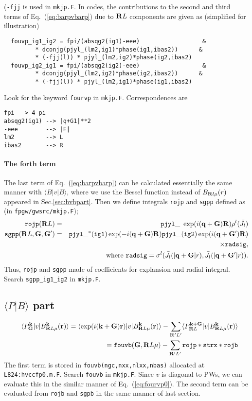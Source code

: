 \documentclass[a4paper,10pt,fleqn]{article}
\newcommand{\bfq}{{\bf q}}
\newcommand{\bfk}{{\bf k}}
\newcommand{\bfr}{{\bf r}}
\newcommand{\bfG}{{\bf G}}
\newcommand{\bfR}{{\bf R}}
\newcommand{\req}[1]{\mbox{Eq.~(\ref{#1})}}
\begin{document}
({\tt -fjj} is used in {\tt mkjp.F}.
In codes, the contributions to the second and third terms of \req{eq:barpvbarp} due to $\bfR{L}$ components are given as (simplified for illustration) 
\begin{verbatim}
  fouvp_ig1_ig2 = fpi/(absqg2(ig1)-eee)                  &
         * dconjg(pjyl_(lm2,ig1)*phase(ig1,ibas2))      &  
         * (-fjj(l)) * pjyl_(lm2,ig2)*phase(ig2,ibas2)
  fouvp_ig2_ig1 = fpi/(absqg2(ig2)-eee)                  & 
         * dconjg(pjyl_(lm2,ig2)*phase(ig2,ibas2))      &
         * (-fjj(l)) * pjyl_(lm2,ig1)*phase(ig1,ibas2)
\end{verbatim}
Look for the keyword \verb!fourvp! in \verb!mkjp.F!.
Correspondences are
\begin{verbatim}
fpi --> 4 pi
absqg2(ig1) --> |q+G1|**2
-eee        --> |E|
lm2         --> L
ibas2       --> R
\end{verbatim}

\paragraph{The forth term}
The last term of \req{eq:barpvbarp} can be calculated essentially
the same manner with $\langle B| v| B\rangle$, where we use the
Bessel function instead of $B_{\bfR{l}\mu}(r)$ appeared in Sec.\ref{sec:bvbpart}.
Then we define integrals 
{\tt rojp} and {\tt sgpp} defined as (in {\tt fpgw/gwsrc/mkjp.F});
\begin{eqnarray}
{\tt rojp}(\bfR L)&=&{\tt pjyl\_} \ 
\exp(i (\bfq+\bfG) \bfR)  \rho^l(\bar{J}_l) \\
{\tt sgpp}(\bfR L,\bfG,\bfG')&=&{\tt pjyl\_^*(ig1)} \exp(-i (\bfq+\bfG) \bfR)
{\tt pjyl\_(ig2)} \exp(i (\bfq+\bfG') \bfR) 
\nonumber \\
&&  \times {\tt  radsig}, \nonumber \\
&& \ {\rm where\ }
{\tt radsig}=\sigma^l(\bar{J}_l(|\bfq+\bfG|r),\bar{J}_l(|\bfq+\bfG'|r)).
\end{eqnarray} 
Thus, {\tt rojp} and {\tt sgpp} made of coefficients for explansion
and radial integral.
Search {\tt sgpp\_ig1\_ig2} in {\tt mkjp.F}. 

\subsection{$\langle P|B \rangle$ part}
\begin{eqnarray}
&&\langle {P}^\bfk_{\bfG} |v| B^\bfk_{\bfR{L}\mu}(\bfr) \rangle
=\langle  \exp(i(\bfk+\bfG)\bfr) 
|v|B^\bfk_{\bfR{L}\mu}(\bfr) \rangle
-\sum_{\bfR'{L'}} 
\langle P^{\bfk+\bfG}_{\bfR{L}}|v|
B^\bfk_{\bfR{L}\mu}(\bfr)  \rangle \nonumber \\
&&={\tt fouvb}(\bfG,\bfR L \mu)
-\sum_{\bfR'L'} {\tt rojp * strx * rojb}
\label{eq:pvb}
\end{eqnarray}
The first term is stored in {\tt fouvb(ngc,nxx,nlxx,nbas)} allocated at 
{\tt L824:hvccfp0.m.F}.
Search {\tt fouvb} in {\tt mkjp.F}. 
Since $v$ is diagonal to PWs,
we can evaluate this in the similar manner of \req{eq:fourvp0}.
The second term can be evaluated from 
{\tt rojb} and {\tt sgpb} in the same manner of last section.
\end{document}
